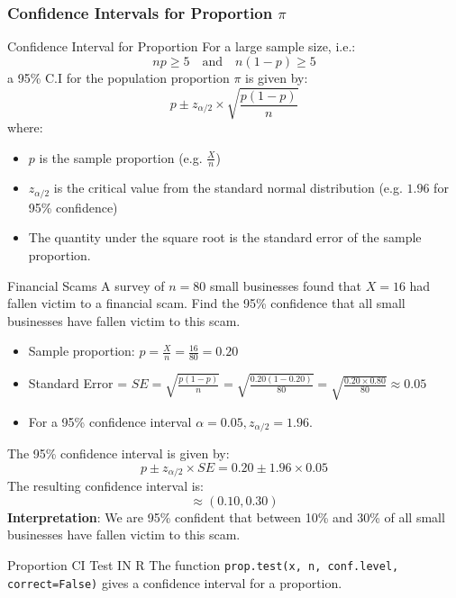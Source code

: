 \documentclass[10pt, total={6in, 8in}]{extarticle}
\begin{document}
\subsubsection{Confidence Intervals for Proportion $\pi$}
\begin{definitionbox}{Confidence Interval for Proportion}{}
    For a large sample size, i.e.:
    $$np \geq 5 \quad\text{and} \quad n(1-p) \geq 5$$
    a 95\% C.I for the population proportion $\pi$ is given by:
    $$p \pm z_{\alpha/2} \times \sqrt{\frac{p(1 - p)}{n}}$$
    where:
    \begin{itemize}
        \item $p$ is the sample proportion (e.g. $\frac{X}{n}$)
        \item $z_{\alpha/2}$ is the critical value from the standard normal distribution (e.g. $1.96$ for 95\% confidence)
        \item The quantity under the square root is the standard error of the sample proportion.
    \end{itemize}
\end{definitionbox}



\begin{examplebox}{Financial Scams}{}
    A survey of $n=80$ small businesses found that $X = 16$ had fallen victim to a financial scam. Find the 95\% confidence that all small businesses have fallen victim to this scam. \\[2ex]

    \begin{itemize}
        \item Sample proportion: $p = \frac{X}{n} = \frac{16}{80} = 0.20$
        \item Standard Error = $SE = \sqrt{\frac{p(1 - p)}{n}} = \sqrt{\frac{0.20(1 - 0.20)}{80}} = \sqrt{\frac{0.20 \times 0.80}{80}} \approx 0.05$
        \item For a 95\% confidence interval $\alpha = 0.05, z_{\alpha/2} = 1.96$.
    \end{itemize}
    The 95\% confidence interval is given by:
    $$p \pm z_{\alpha/2} \times SE = 0.20 \pm 1.96 \times 0.05$$
    The resulting confidence interval is:
    $$\approx (0.10, 0.30)$$
    \textbf{Interpretation}: We are 95\% confident that between 10\% and 30\% of all small businesses have fallen victim to this scam.
\end{examplebox}
\begin{conceptbox}{Proportion CI Test IN R}{}
    The function \texttt{prop.test(x, n, conf.level, correct=False)}  gives a confidence interval for a proportion.
\end{conceptbox}
\end{document}
